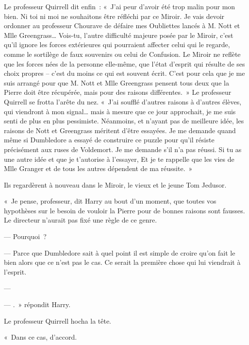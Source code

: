 Le professeur Quirrell dit enfin~: «~J'ai peur d'avoir été trop malin pour mon bien. Ni toi ni moi ne souhaitons être réfléchi par ce Miroir. Je vais devoir ordonner au professeur Chourave de défaire mes Oubliettes lancés à M. Nott et Mlle Greengrass… Vois-tu, l'autre difficulté majeure posée par le Miroir, c'est qu'il ignore les forces extérieures qui pourraient affecter celui qui le regarde, comme le sortilège de faux souvenirs ou celui de Confusion. Le Miroir ne reflète que les forces nées de la personne elle-même, que l'état d'esprit qui résulte de ses choix propres -- c'est du moins ce qui est souvent écrit. C'est pour cela que je me suis arrangé pour que M. Nott et Mlle Greengrass pensent tous deux que la Pierre doit être récupérée, mais pour des raisons différentes.~» Le professeur Quirrell se frotta l'arête du nez. «~J'ai soufflé d'autres raisons à d'autres élèves, qui viendront à mon signal… mais à mesure que ce jour approchait, je me suis senti de plus en plus pessimiste. Néanmoins, et n'ayant pas de meilleure idée, les raisons de Nott et Greengrass méritent d'être essayées. Je me demande quand même si Dumbledore a essayé de construire ce puzzle pour qu'il résiste précisément aux ruses de Voldemort. Je me demande s'il n'a pas réussi. Si tu as une autre idée et que je t'autorise à l'essayer,  Et je te rappelle que les vies de Mlle Granger et de tous les autres dépendent de ma réussite.~»

Ils regardèrent à nouveau dans le Miroir, le vieux et le jeune Tom Jedusor.

«~Je pense, professeur, dit Harry au bout d'un moment, que toutes vos hypothèses sur le besoin de vouloir la Pierre pour de bonnes raisons sont fausses. Le directeur n'aurait pas fixé une règle de ce genre.

--- Pourquoi~?

--- Parce que Dumbledore sait à quel point il est simple de croire qu'on fait le bien alors que ce n'est pas le cas. Ce serait la première chose qui lui viendrait à l'esprit.

--- 

--- .~» répondit Harry.

Le professeur Quirrell hocha la tête.

«~Dans ce cas, d'accord.

